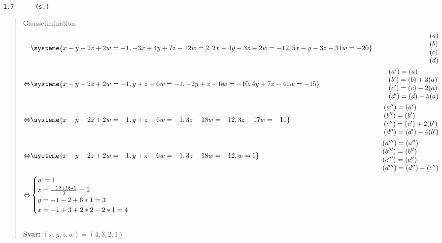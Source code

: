 \documentclass[a4paper]{article}
\newcommand{\tskcol}[1]{\textcolor{tskcol}{#1}}
\begin{document}
\pagebreak
\texttt{\tskcol{1.7~~~~~ (s.)}}
\begin{quotation}
	\noindent
	Gausselimination:
	\begin{align*}
		&\systeme{
			  x- y-2z+ 2w=-1,
			-3x+4y+7z-12w=2,
			 2x-4y-3z- 2w=-12,
			 5x- y-3z-31w=-20}  
		&\begin{array}{l} 
		(a) \\ 
		(b) \\
		(c) \\
		(d)
		\end{array} \\ \Leftrightarrow
		&\systeme{
			x- y-2z+ 2w=-1,
			   y+ z- 6w=-1,
			 -2y+ z- 6w=-10,
			  4y+7z-41w=-15}  
		&\begin{array}{l} 
		(a')=(a) \\ 
		(b')=(b)+3(a) \\
		(c')=(c)-2(a) \\
		(d')=(d)-5(a)
		\end{array} \\ \Leftrightarrow
		&\systeme{
			x- y-2z+ 2w=-1,
			   y+ z- 6w=-1,
			     3z-18w=-12,
			     3z-17w=-11}  
		&\begin{array}{l} 
		(a'')=(a') \\ 
		(b'')=(b') \\
		(c'')=(c')+2(b') \\
		(d'')=(d')-4(b')
		\end{array} \\ \Leftrightarrow
		&\systeme{
			x- y-2z+ 2w=-1,
			   y+ z- 6w=-1,
			     3z-18w=-12,
			          w=1}  
		&\begin{array}{l} 
		(a''')=(a'') \\ 
		(b''')=(b'') \\
		(c''')=(c'') \\
		(d''')=(d'')-(c'')
		\end{array} \\ \Leftrightarrow
		&\begin{cases}
		w=1 \\
		z=\frac{-12+18*1}{3}=2 \\
		y=-1-2+6*1=3\\
		x=-1+3+2*2-2*1=4
		\end{cases}
	\end{align*}
	\\
	\textbf{Svar:} $(x,y,z,w)=(4,3,2,1)$
\end{quotation}
\end{document}
